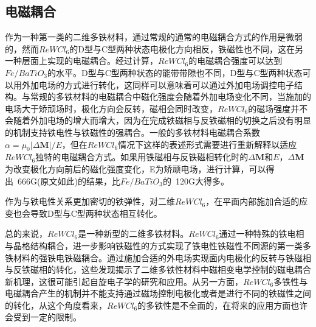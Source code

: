 \subsection{电磁耦合}

作为一种第一类的二维多铁材料，通过常规的通常的电磁耦合方式的作用是微弱的，然而$ReWCl_{6}$的D型与C型两种状态电极化方向相反，铁磁性也不同，这在另一种层面上实现的电磁耦合。经过计算，$ReWCl_{6}$的电磁耦合强度可以达到$Fe/BaTiO_{3}$的水平。D型与C型两种状态的能带带隙也不同，D型与C型两种状态可以用外加电场的方式进行转化，这同样可以意味着可以通过外加电场调控电子结构。与常规的多铁材料的电磁耦合中磁化强度会随着外加电场变化不同，当施加的电场大于矫顽场时，极化方向会反转，磁相会同时改变，$ReWCl_{6}$的磁场强度并不会随着外加电场的增大而增大，因为在完成铁磁相与反铁磁相的切换之后没有明显的机制支持铁电性与铁磁性的强耦合。一般的多铁材料电磁耦合系数$\alpha=\mu_{0}|\Delta\bm{M}|/E$，但在$ReWCl_{6}$情况下这样的表述形式需要进行重新解释以适应$ReWCl_{6}$独特的电磁耦合方式。如果用铁磁相与反铁磁相转化时的$\Delta\bm{M}\text{和}E$，$\Delta\bm{M}$为改变极化方向前后的磁化强度变化，E为矫顽电场，进行计算，可以得出~666G(原文如此)的结果，比$Fe/BaTiO_{3}$的~120G大得多。

作为与铁电性关系更加密切的铁弹性，对二维$ReWCl_{6}$，在平面内部施加合适的应变也会导致D型与C型两种状态相互转化。\cite{ISI:000274700900024}



总的来说，$ReWCl_{6}$是一种新型的二维多铁材料。$ReWCl_{6}$通过一种特殊的铁电相与晶格结构耦合，进一步影响铁磁性的方式实现了铁电性铁磁性不同源的第一类多铁材料的强铁电铁磁耦合。通过施加合适的外电场实现面内电极化的反转与铁磁相与反铁磁相的转化，这些发现揭示了二维多铁性材料中磁相变电学控制的磁电耦合新机理，这很可能引起自旋电子学的研究和应用。从另一方面，$ReWCl_{6}$多铁性与电磁耦合产生的机制并不能支持通过磁场控制电极化或者是进行不同的铁磁性之间的转化，从这个角度看来，$ReWCl_{6}$的多铁性是不全面的，在将来的应用方面也许会受到一定的限制。